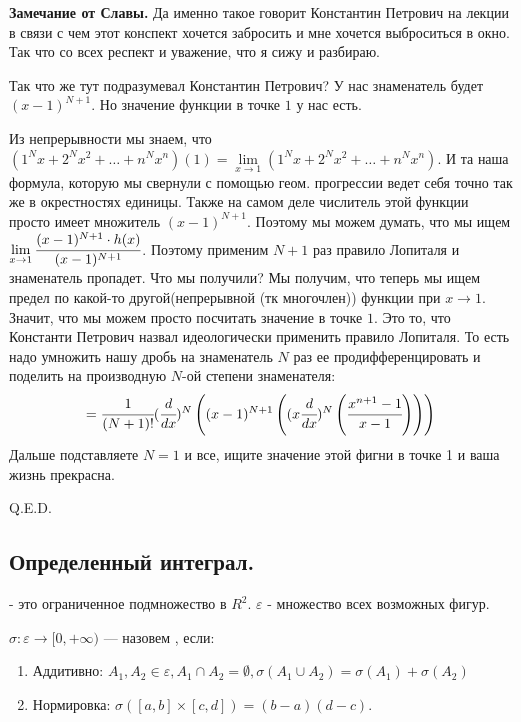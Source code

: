\textbf{Замечание от Славы. }Да именно такое говорит Константин Петрович на лекции в связи  с чем этот конспект хочется забросить и мне хочется выброситься в окно.  Так что со всех респект и уважение, что я сижу и разбираю.

Так что же тут подразумевал Константин Петрович? У нас  знаменатель будет $(x-1)^{N+1}$. Но значение функции в точке $1$ у нас есть. 

Из непрерывности мы знаем, что $(1^Nx +2^Nx^2 +\ldots +n^Nx^n)(1) = \lim\limits_{x \rightarrow 1} (1^Nx +2^Nx^2 +\ldots +n^Nx^n)$. И та наша формула, которую мы свернули с помощью геом. прогрессии ведет себя точно так же в окрестностях единицы. Также на самом деле числитель этой функции просто имеет множитель $(x-1)^{N+1}$. Поэтому мы можем думать, что мы ищем $\lim\limits_{x\rightarrow1} \cfrac{(x-1)^{N+1}\cdot h(x)}{(x-1)^{N+1}}$. Поэтому применим ${N+1}$ раз правило Лопиталя и знаменатель пропадет. Что мы получили? Мы получим, что теперь мы ищем предел по какой-то другой(непрерывной (тк многочлен)) функции при $x\rightarrow 1$. Значит, что мы можем просто посчитать значение в точке $1    $. Это то, что Константи Петрович назвал идеологически применить правило Лопиталя. То есть надо умножить нашу дробь на знаменатель $N$ раз ее продифференцировать и поделить на производную $N$-ой степени знаменателя:
$$= \cfrac{1}{(N+1)!}(\cfrac{d}{dx})^N\left((x-1)^{N+1}\left((x\cfrac{d}{dx})^N \left(\cfrac{x^{n+1}-1}{x-1}\right)\right)\right)$$
Дальше подставляете $N=1$ и все, ищите значение этой фигни в точке 1 и ваша жизнь прекрасна.

\hfill Q.E.D.







\pagebreak

\subsection{Определенный интеграл.}


  - это ограниченное подмножество в $R^2$. $\varepsilon$ - множество всех возможных фигур.

$\sigma: \varepsilon \rightarrow [0,+\infty)$ ---  назовем , если:
\begin{enumerate}
    \item Аддитивно: $A_1,A_2 \in \varepsilon, A_1\cap A_2 = \emptyset, \sigma(A_1\cup A_2) = \sigma(A_1)+\sigma(A_2)$
\item Нормировка: $\sigma ([a,b]\times[c,d]) = (b-a)(d-c)$.
\end{enumerate}

